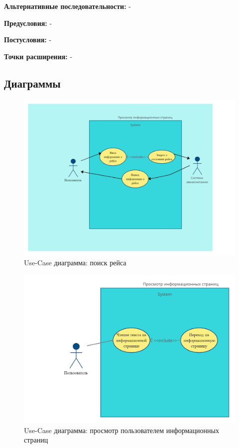 \textbf{Альтернативные последовательности:} -

\textbf{Предусловия:} -

\textbf{Постусловия:} -

\textbf{Точки расширения:} -


\newpage

\subsection{Диаграммы}

\begin{figure}
      \includegraphics[width=16cm]{4-actions/Way_search.jpg}
      \centering
      \caption{Use-Case диаграмма: поиск рейса}
\end{figure}

\begin{figure}
      \includegraphics[width=16cm]{4-actions/Look_info_pages.jpg}
      \centering
      \caption{Use-Case диаграмма: просмотр пользователем информационных страниц}
\end{figure}

